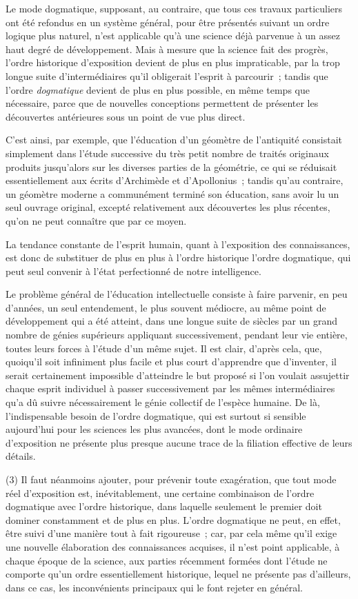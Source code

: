 \documentclass[french,twoside]{book} %
\begin{document}
Le mode dogmatique, supposant, au contraire, que tous ces travaux particuliers ont été refondus en un système général, pour être présentés suivant un ordre logique plus naturel, n’est applicable qu’à une science déjà parvenue à un assez haut degré de développement. Mais à mesure que la science fait des progrès, l’ordre historique d’exposition devient de plus en plus impraticable, par la trop longue suite d’intermédiaires qu’il obligerait l’esprit à parcourir ; tandis que l’ordre {\itshape dogmatique} devient de plus en plus possible, en même temps que nécessaire, parce que de nouvelles conceptions permettent de présenter les découvertes antérieures sous un point de vue plus direct.\par
C’est ainsi, par exemple, que l’éducation d’un géomètre de l’antiquité consistait simplement dans l’étude successive du très petit nombre de traités originaux produits jusqu’alors sur les diverses parties de la géométrie, ce qui se réduisait essentiellement aux écrits d’Archimède et d’Apollonius ; tandis qu’au contraire, un géomètre moderne a communément terminé son éducation, sans avoir lu un seul ouvrage original, excepté relativement aux découvertes les plus récentes, qu’on ne peut connaître que par ce moyen.\par
La tendance constante de l’esprit humain, quant à l’exposition des connaissances, est donc de substituer de plus en plus à l’ordre historique l’ordre dogmatique, qui peut seul convenir à l’état perfectionné de notre intelligence.\par
Le problème général de l’éducation intellectuelle consiste à faire parvenir, en peu d’années, un seul entendement, le plus souvent médiocre, au même point de développement qui a été atteint, dans une longue suite de siècles par un grand nombre de génies supérieurs appliquant successivement, pendant leur vie entière, toutes leurs forces à l’étude d’un même sujet. Il est clair, d’après cela, que, quoiqu’il soit infiniment plus facile et plus court d’apprendre que d’inventer, il serait certainement impossible d’atteindre le but proposé si l’on voulait assujettir chaque esprit individuel à passer successivement par les mêmes intermédiaires qu’a dû suivre nécessairement le génie collectif de l’espèce humaine. De là, l’indispensable besoin de l’ordre dogmatique, qui est surtout si sensible aujourd’hui pour les sciences les plus avancées, dont le mode ordinaire d’exposition ne présente plus presque aucune trace de la filiation effective de leurs détails.\par
(3) Il faut néanmoins ajouter, pour prévenir toute exagération, que tout mode réel d’exposition est, inévitablement, une certaine combinaison de l’ordre dogmatique avec l’ordre historique, dans laquelle seulement le premier doit dominer constamment et de plus en plus. L’ordre dogmatique ne peut, en effet, être suivi d’une manière tout à fait rigoureuse ; car, par cela même qu’il exige une nouvelle élaboration des connaissances acquises, il n’est point applicable, à chaque époque de la science, aux parties récemment formées dont l’étude ne comporte qu’un ordre essentiellement historique, lequel ne présente pas d’ailleurs, dans ce cas, les inconvénients principaux qui le font rejeter en général.\par
\end{document}

